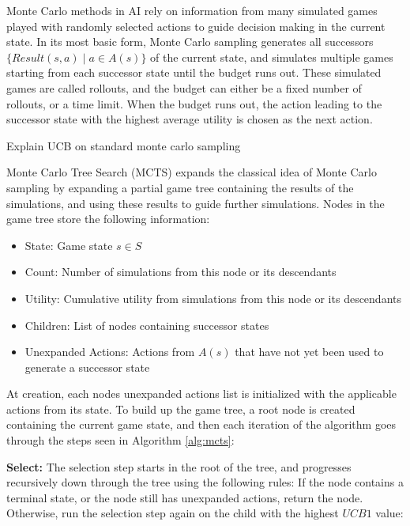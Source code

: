 Monte Carlo methods in AI rely on information from many simulated games 
played with randomly selected actions to guide decision making in the 
current state. In its most basic form, Monte Carlo sampling generates
all successors $\{ Result(s, a) \;|\; a \in A(s) \}$ of the current
state, and simulates multiple games starting from each successor state
until the budget runs out. These simulated games are called rollouts,
and the budget can either be a fixed number of rollouts, or a time
limit. When the budget runs out, the action leading to the successor
state with the highest average utility is chosen as the next action.



\todo Explain UCB on standard monte carlo sampling

Monte Carlo Tree Search (MCTS) expands the classical idea of Monte Carlo
sampling by expanding a partial game tree containing the results of
the simulations, and using these results to guide further simulations.
Nodes in the game tree store the following information:

\begin{itemize}
    \item State: Game state $s \in S$
    \item Count: Number of simulations from this node or its descendants
    \item Utility: Cumulative utility from simulations from this node or its descendants
    \item Children: List of nodes containing successor states
    \item Unexpanded Actions: Actions from $A(s)$ that have not yet been used to generate a successor state 
\end{itemize}

At creation, each nodes unexpanded actions list is initialized
with the applicable actions from its state. To build up the 
game tree, a root node is created containing the 
current game state, and then each iteration of the algorithm goes through 
the steps seen in Algorithm \ref{alg:mcts}:



\textbf{Select:} The selection step starts in the root of the tree,
and progresses recursively down through the tree using the following
rules: If the node contains a terminal state, or the node still has
unexpanded actions, return the node. Otherwise, run the selection
step again on the child with the highest $UCB1$ value:


